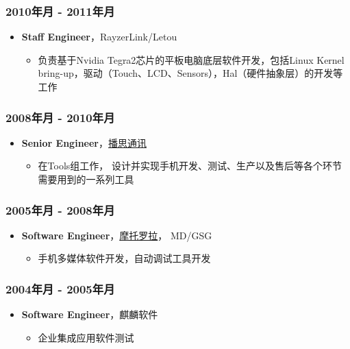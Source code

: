 \documentclass[11pt,dvipdfmx,CJKbookmarks]{article}
\begin{document}
\begin{CJK*}{UTF8}{simsun}
\subsubsection{2010\thinspace 年\thinspace 月 - 2011\thinspace 年\thinspace 月}
\label{sec:org6ff852e}
\begin{itemize}
\item \textbf{Staff Engineer}，RayzerLink/Letou
\begin{itemize}
\item 负责基于\thinspace Nvidia Tegra2\thinspace 芯片的平板电脑底层软件开发，包括\thinspace Linux Kernel bring-up，驱动（Touch、LCD、Sensors），Hal（硬件抽象层）的开发等工作
\end{itemize}
\end{itemize}
\subsubsection{2008\thinspace 年\thinspace 月 - 2010\thinspace 年\thinspace 月}
\label{sec:orgc4d7621}
\begin{itemize}
\item \textbf{Senior Engineer}，\href{http://www.borqs.com}{播思通讯}

\begin{itemize}
\item 在\thinspace Tools\thinspace 组工作， 设计并实现手机开发、测试、生产以及售后等各个环节需要用到的一系列工具
\end{itemize}
\end{itemize}
\subsubsection{2005\thinspace 年\thinspace 月 - 2008\thinspace 年\thinspace 月}
\label{sec:org89ca168}
\begin{itemize}
\item \textbf{Software Engineer}，\href{http://motorola.com}{摩托罗拉}， MD/GSG

\begin{itemize}
\item 手机多媒体软件开发，自动调试工具开发
\end{itemize}
\end{itemize}

\subsubsection{2004\thinspace 年\thinspace 月 - 2005\thinspace 年\thinspace 月}
\label{sec:org45f78b6}
\begin{itemize}
\item \textbf{Software Engineer}，麒麟软件
\begin{itemize}
\item 企业集成应用软件测试
\end{itemize}
\end{itemize}


\end{CJK*}
\end{document}
